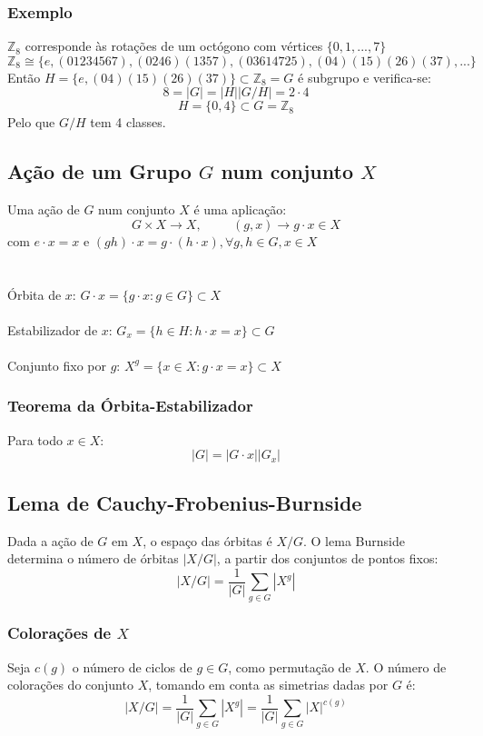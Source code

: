 \documentclass[10pt,a4paper]{report}
\begin{document}
\subsubsection{Exemplo}
$\mathbb{Z}_8$ corresponde às rotações de um octógono com vértices $\{0,1,...,7\}$
$$
\mathbb{Z}_8 \cong \{e, (01234567), (0246)(1357), (03614725), (04)(15)(26)(37), ...\}
$$
Então $H = \{e,(04)(15)(26)(37)\} \subset \mathbb{Z}_8 = G$ é subgrupo e verifica-se:
$$
8 = |G| = |H||G/H| = 2 \cdot 4
$$
$$
H = \{0,4\} \subset G = \mathbb{Z}_8
$$
Pelo que $G/H$ tem 4 classes.
\subsection{Ação de um Grupo $G$ num conjunto $X$}
Uma ação de $G$ num conjunto $X$ é uma aplicação:
$$
G \times X \rightarrow X, \hspace{1cm} (g,x) \rightarrow g \cdot x \in X
$$
com $e \cdot x = x$ e $(gh) \cdot x = g \cdot (h \cdot x), \forall g, h \in G, x \in X$\\
\\
\\
Órbita de $x$: $G \cdot x = \{g \cdot x : g \in G\} \subset X$\\
\\
Estabilizador de $x$: $G_x = \{h \in H : h \cdot x = x\} \subset G$\\
\\
Conjunto fixo por $g$: $X^g = \{x \in X : g \cdot x = x\} \subset X$
\subsubsection{Teorema da Órbita-Estabilizador}
Para todo $x \in X$:
$$
|G| = |G \cdot x||G_x|
$$
\subsection{Lema de Cauchy-Frobenius-Burnside}
Dada a ação de $G$ em $X$, o espaço das órbitas é $X/G$. O lema Burnside determina o número de órbitas $|X/G|$, a partir dos conjuntos de pontos fixos:
$$
|X/G| = \frac{1}{|G|} \sum_{g \in G} |X^g|
$$
\subsubsection{Colorações de $X$}
Seja $c(g)$ o número de ciclos de $g \in G$, como permutação de $X$. O número de colorações do conjunto $X$, tomando em conta as simetrias dadas por $G$ é:
$$
|X/G| = \frac{1}{|G|} \sum_{g \in G} |X^g| = \frac{1}{|G|} \sum_{g \in G} |X|^{c(g)}
$$
\end{document}
